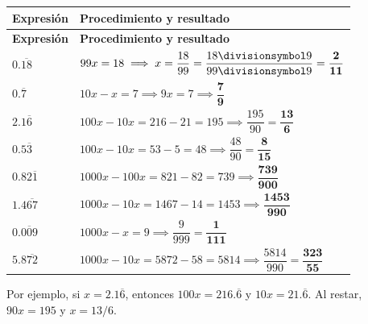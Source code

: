 \documentclass[spanish,letterpaper,oneside]{article}
\let\div\divisionsymbol
\begin{document}
{\small{}\renewcommand{\arraystretch}{1.3}
\begin{longtable}{|>{\raggedright\arraybackslash}p{}|>{\raggedright\arraybackslash}p{}|}\hline
\rowcolor{iiiepePale} \textbf{Expresión} & \textbf{Procedimiento y resultado} \\\hline
\endfirsthead
\hline
\rowcolor{iiiepePale} \textbf{Expresión} & \textbf{Procedimiento y resultado} \\\hline
\endhead
$0.\overline{18}$ & $99x = 18 \implies x = \dfrac{18}{99} = \dfrac{18\div 9}{99\div 9} = \mathbf{\dfrac{2}{11}}$ \\\hline
$0.\overline7$ & $10x - x = 7 \implies 9x = 7 \implies \mathbf{\dfrac{7}{9}}$ \\\hline
$2.1\overline6$ & $100x - 10x = 216 - 21 = 195 \implies \dfrac{195}{90} = \mathbf{\dfrac{13}{6}}$ \\\hline
$0.5\overline3$ & $100x - 10x = 53 - 5 = 48 \implies \dfrac{48}{90} = \mathbf{\dfrac{8}{15}}$ \\\hline
$0.82\overline1$ & $1000x - 100x = 821 - 82 = 739 \implies \mathbf{\dfrac{739}{900}}$ \\\hline
$1.4\overline{67}$ & $1000x - 10x = 1467 - 14 = 1453 \implies \mathbf{\dfrac{1453}{990}}$ \\\hline
$0.\overline{009}$ & $1000x - x = 9 \implies \dfrac{9}{999} = \mathbf{\dfrac{1}{111}}$ \\\hline
$5.8\overline{72}$ & $1000x - 10x = 5872 - 58 = 5814 \implies \dfrac{5814}{990} = \mathbf{\dfrac{323}{55}}$ \\\hline
\end{longtable}}

Por ejemplo, si $x=2.1\overline6$, entonces $100x=216.\overline6$ y $10x=21.\overline6$. Al restar, $90x=195$ y $x=13/6$.
\end{document}
